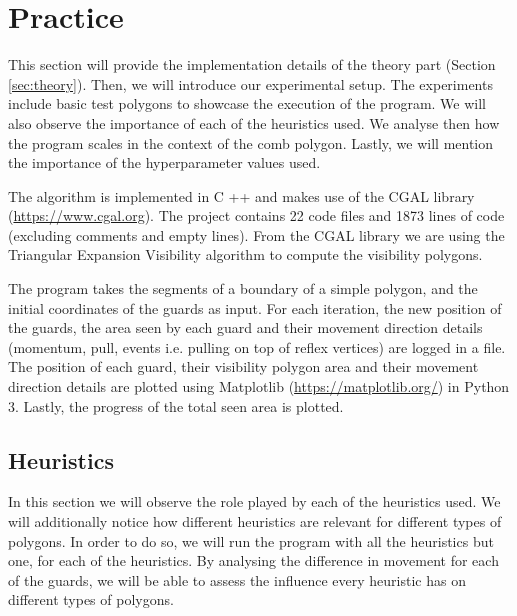\section{Practice}
\label{sec:experiments}


This section will provide the implementation details of the theory part (Section \ref{sec:theory}). Then, we will introduce our experimental setup. The experiments include basic test polygons to showcase the execution of the program. We will also observe the importance of each of the heuristics used. We analyse then how the program scales in the context of the comb polygon. Lastly, we will mention the importance of the hyperparameter values used.

The algorithm is implemented in C ++ and makes use of the CGAL library (\url{https://www.cgal.org}). The project contains 22 code files and 1873 lines of code (excluding comments and empty lines).
From the CGAL library we are using the Triangular Expansion Visibility algorithm \cite{DBLP:journals/corr/BungiuHHHK14} to compute the visibility polygons.

The program takes the segments of a boundary of a simple polygon, and the initial coordinates of the guards as input. For each iteration, the new position of the guards, the area seen by each guard and their movement direction details (momentum, pull, events i.e. pulling on top of reflex vertices) are logged in a file. The position of each guard, their visibility polygon area and their movement direction details are plotted using Matplotlib (\url{https://matplotlib.org/}) in Python 3. Lastly, the progress of the total seen area is plotted.





\subsection{Heuristics}
In this section we will observe the role played by each of the heuristics used. We will additionally notice how different heuristics are relevant for different types of polygons. In order to do so, we will run the program with all the heuristics but one, for each of the heuristics. By analysing the difference in movement for each of the guards, we will be able to assess the influence every heuristic has on different types of polygons.

